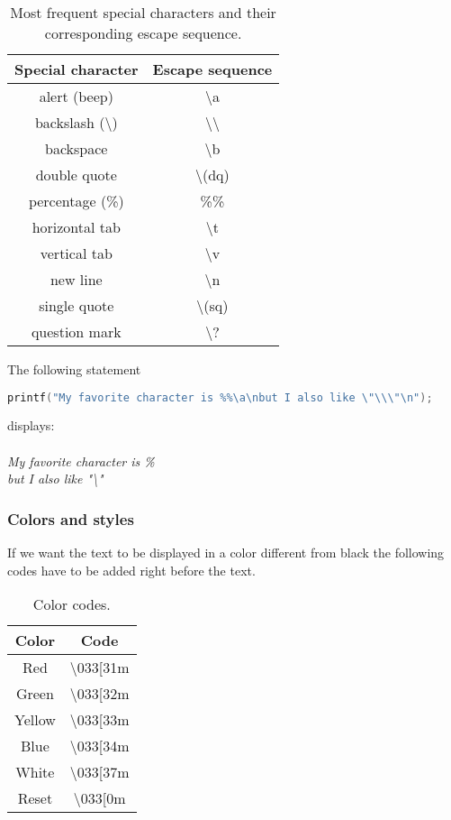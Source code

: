 \begin{table}[h!]
\centering
\begin{tabular}{ |c|c| }
    \hline
    \textbf{Special character} & \textbf{Escape sequence} \\
    \hline
    alert (beep) & \textbackslash a \\
    \hline
    backslash (\textbackslash) & \textbackslash\textbackslash \\
    \hline
    backspace & \textbackslash b \\
    \hline
    double quote & \textbackslash (dq) \\
    \hline
    percentage (\%) & \%\% \\
    \hline
    horizontal tab & \textbackslash t \\
    \hline
    vertical tab & \textbackslash v \\
    \hline
    new line & \textbackslash n \\
    \hline
    single quote & \textbackslash (sq) \\
    \hline
    question mark & \textbackslash? \\
    \hline
\end{tabular}
\caption{Most frequent special characters and their corresponding escape sequence.}
\end{table}

The following statement
\begin{lstlisting}[language=C]
    printf("My favorite character is %%\a\nbut I also like \"\\\"\n");
\end{lstlisting}
displays: \\ \\
\noindent\textit{My favorite character is \%} \\
\noindent\textit{but I also like "\textbackslash"}

\subsubsection{Colors and styles}
If we want the text to be displayed in a color different from black the following codes have to be added right before the text.

\begin{table}[h!]
\centering
\begin{tabular}{ |c|c| }
    \hline
    \textbf{Color} & \textbf{Code} \\
    \hline
    Red & \textbackslash 033[31m \\
    \hline
    Green & \textbackslash 033[32m \\
    \hline
    Yellow & \textbackslash 033[33m \\
    \hline
    Blue & \textbackslash 033[34m \\
    \hline
    White & \textbackslash 033[37m \\
    \hline
    Reset & \textbackslash 033[0m \\
    \hline
\end{tabular}
\caption{Color codes.}
\end{table}

